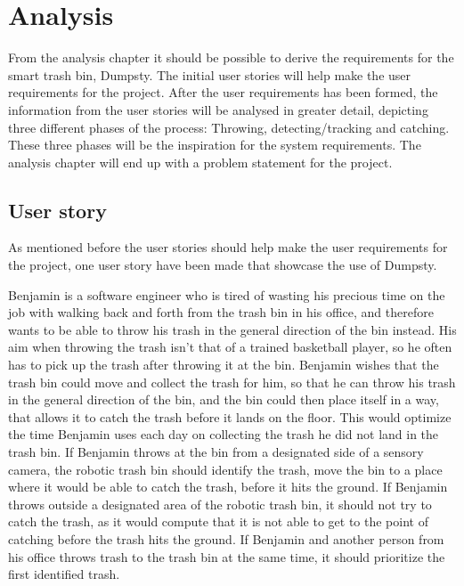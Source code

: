 \chapter{Analysis}
\label{chap:Analysis}
From the analysis chapter it should be possible to derive the requirements for the smart trash bin, Dumpsty. The initial user stories will help make the user requirements for the project. After the user requirements has been formed, the information from the user stories will be analysed in greater detail, depicting three different phases of the process: Throwing, detecting/tracking and catching. These three phases will be the inspiration for the system requirements. 
The analysis chapter will end up with a problem statement for the project. 

\section{User story}
\label{sec:User story}
As mentioned before the user stories should help make the user requirements for the project, one user story have been made that showcase the use of Dumpsty.

Benjamin is a software engineer who is tired of wasting his precious time on the job with walking back and forth from the trash bin in his office, and therefore wants to be able to throw his trash in the general direction of the bin instead. His aim when throwing the trash isn’t that of a trained basketball player, so he often has to pick up the trash after throwing it at the bin. \newline
Benjamin wishes that the trash bin could move and collect the trash for him, so that he can throw his trash in the general direction of the bin, and the bin could then place itself in a way, that allows it to catch the trash before it lands on the floor. This would optimize the time Benjamin uses each day on collecting the trash he did not land in the trash bin.\newline
If Benjamin throws at the bin from a designated side of a sensory camera, the robotic trash bin should identify the trash, move the bin to a place where it would be able to catch the trash, before it hits the ground.\newline
If Benjamin throws outside a designated area of the robotic trash bin, it should not try to catch the trash, as it would compute that it is not able to get to the point of catching before the trash hits the ground.\newline
If Benjamin and another person from his office throws trash to the trash bin at the same time, it should prioritize the first identified trash.


